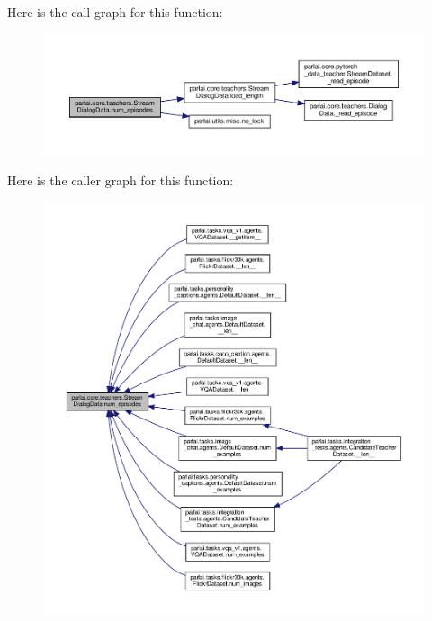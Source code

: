 Here is the call graph for this function\+:
\nopagebreak
\begin{figure}[H]
\begin{center}
\leavevmode
\includegraphics[width=350pt]{classparlai_1_1core_1_1teachers_1_1StreamDialogData_a05f4816d029700a4bf9fd1eeafcb527c_cgraph}
\end{center}
\end{figure}
Here is the caller graph for this function\+:
\nopagebreak
\begin{figure}[H]
\begin{center}
\leavevmode
\includegraphics[width=350pt]{classparlai_1_1core_1_1teachers_1_1StreamDialogData_a05f4816d029700a4bf9fd1eeafcb527c_icgraph}
\end{center}
\end{figure}
\mbox{\label{classparlai_1_1core_1_1teachers_1_1StreamDialogData_ada385b7a8f549f4d65eb910b668c77e5}} 
